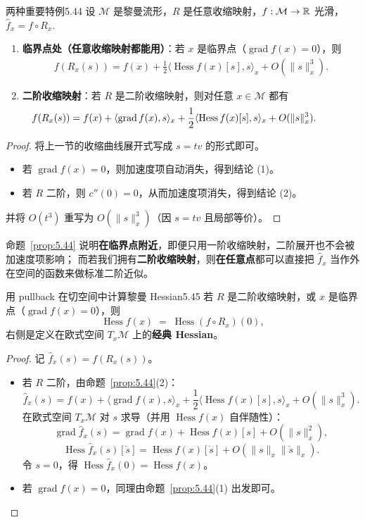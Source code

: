 \documentclass[11pt,a4paper]{article}
\newcommand{\wh}{\widehat}
\renewcommand{\hat}{\wh}
\renewcommand{\*}{\leftindex^*}
\DeclareMathOperator{\grad}{grad}
\DeclareMathOperator{\Hess}{Hess}
\newcommand{\cM}{\mathcal{M}} \newcommand{\cN}{\mathcal{N}}
\begin{document}
\begin{proposition}{两种重要特例}{5.44}
设 $\cM$ 是黎曼流形，$R$ 是任意收缩映射，$f:\cM\to \R$ 光滑，$\hat f_x=f\circ R_x$.
\begin{enumerate}
\item[(1)] \textbf{临界点处（任意收缩映射都能用）}：若 $x$ 是临界点（$\grad f(x)=0$），则
\begin{align*}
f(R_x(s)) = f(x) + \frac{1}{2}\langle \Hess f(x)[s], s\rangle_x + O(\|s\|_x^3).
\end{align*}
\item[(2)] \textbf{二阶收缩映射}：若 $R$ 是二阶收缩映射，则对任意 $x\in\cM$ 都有
\begin{align*}
\hspace{-12.3mm}f(R_x(s))
= f(x) + \langle \grad f(x), s\rangle_x
+ \frac{1}{2}\langle \Hess f(x)[s], s\rangle_x
+ O(\|s\|_x^3).
\end{align*}
\end{enumerate}
\end{proposition}

\begin{proof}
将上一节的收缩曲线展开式写成 $s=t v$ 的形式即可。
\begin{itemize}
\item 若 $\grad f(x)=0$，则加速度项自动消失，得到结论 (1)。
\item 若 $R$ 二阶，则 $c''(0)=0$，从而加速度项消失，得到结论 (2)。
\end{itemize}
并将 $O(t^3)$ 重写为 $O(\|s\|_x^3)$（因 $s=t v$ 且局部等价）。
\end{proof}

\medskip
命题~\ref{prop:5.44} 说明\textbf{在临界点附近}，即便只用一阶收缩映射，二阶展开也不会被加速度项影响；
而若我们拥有\textbf{二阶收缩映射}，则\textbf{在任意点}都可以直接把 $\hat f_x$ 当作外在空间的函数来做标准二阶近似。

\begin{proposition}{用 pullback 在切空间中计算黎曼 Hessian}{5.45}
若 $R$ 是二阶收缩映射，或 $x$ 是临界点（$\grad f(x)=0$），则
\[
\Hess f(x) \;=\; \Hess(f\circ R_x)(0),
\]
右侧是定义在欧式空间 $T_x\cM$ 上的\textbf{经典 Hessian}。
\end{proposition}

\begin{proof}
记 $\hat f_x(s)=f(R_x(s))$。
\begin{itemize}
\item 若 $R$ 二阶，由命题~\ref{prop:5.44}(2)：
\[
\hat f_x(s)= f(x)+\langle \grad f(x), s\rangle_x + \frac12\langle \Hess f(x)[s],s\rangle_x + O(\|s\|_x^3).
\]
在欧式空间 $T_x\cM$ 对 $s$ 求导（并用 $\Hess f(x)$ 自伴随性）：
\[
\grad \hat f_x(s) = \grad f(x) + \Hess f(x)[s] + O(\|s\|_x^2),
\]
\[
\Hess \hat f_x(s)[\dot s] = \Hess f(x)[\dot s] + O(\|s\|_x\|\dot s\|_x).
\]
令 $s=0$，得 $\Hess \hat f_x(0)=\Hess f(x)$。
\item 若 $\grad f(x)=0$，同理由命题~\ref{prop:5.44}(1) 出发即可。
\end{itemize}
\end{proof}
\end{document}
